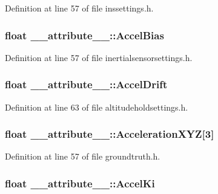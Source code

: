 \-Definition at line 57 of file inssettings.\-h.

\hypertarget{struct____attribute_____a810dd3340f54169547a832ce775b01dd}{
\subsubsection[{\-Accel\-Bias}]{\setlength{\rightskip}{0pt plus 5cm}float {\bf \-\_\-\-\_\-attribute\-\_\-\-\_\-\-::\-Accel\-Bias}}}\label{struct____attribute_____a810dd3340f54169547a832ce775b01dd}


\-Definition at line 57 of file inertialsensorsettings.\-h.

\hypertarget{struct____attribute_____ab5140191f3fa2575a486cdb8d7e78159}{
\subsubsection[{\-Accel\-Drift}]{\setlength{\rightskip}{0pt plus 5cm}float {\bf \-\_\-\-\_\-attribute\-\_\-\-\_\-\-::\-Accel\-Drift}}}\label{struct____attribute_____ab5140191f3fa2575a486cdb8d7e78159}


\-Definition at line 63 of file altitudeholdsettings.\-h.

\hypertarget{struct____attribute_____a78dadcd89df0be899c59a6aadb933e81}{
\subsubsection[{\-Acceleration\-X\-Y\-Z}]{\setlength{\rightskip}{0pt plus 5cm}float {\bf \-\_\-\-\_\-attribute\-\_\-\-\_\-\-::\-Acceleration\-X\-Y\-Z}\mbox{[}3\mbox{]}}}\label{struct____attribute_____a78dadcd89df0be899c59a6aadb933e81}


\-Definition at line 57 of file groundtruth.\-h.

\hypertarget{struct____attribute_____a424d6c5ce64662f3dc33822b57ec6bb0}{
\subsubsection[{\-Accel\-Ki}]{\setlength{\rightskip}{0pt plus 5cm}float {\bf \-\_\-\-\_\-attribute\-\_\-\-\_\-\-::\-Accel\-Ki}}}\label{struct____attribute_____a424d6c5ce64662f3dc33822b57ec6bb0}


